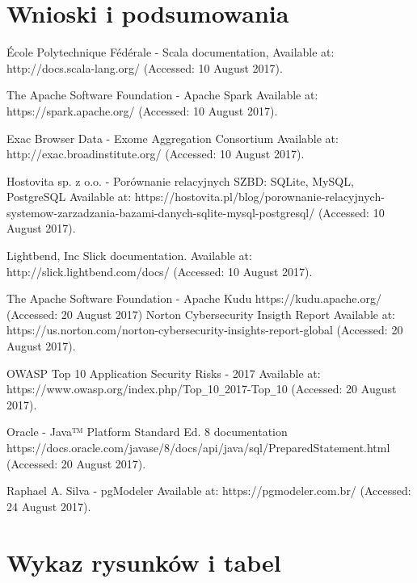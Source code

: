 \documentclass[a4paper,12pt,twoside]{article}
\begin{document}
\section{Wnioski i podsumowania}  

\newpage
\begin{thebibliography}{99}

École Polytechnique Fédérale - Scala documentation,
Available at: http://docs.scala-lang.org/ (Accessed: 10 August 2017).

The Apache Software Foundation - Apache Spark Available at: https://spark.apache.org/ (Accessed: 10 August 2017).

Exac Browser Data - Exome Aggregation Consortium  
Available at: http://exac.broadinstitute.org/ (Accessed: 10 August 2017).

Hostovita sp. z o.o. - Porównanie relacyjnych SZBD: SQLite, MySQL, PostgreSQL
Available at:
https://hostovita.pl/blog/porownanie-relacyjnych-systemow-zarzadzania-bazami-danych-sqlite-mysql-postgresql/ (Accessed: 10 August 2017).

Lightbend, Inc Slick documentation. Available at:
http://slick.lightbend.com/docs/ (Accessed: 10 August 2017).

The Apache Software Foundation - Apache Kudu
https://kudu.apache.org/ (Accessed: 20 August 2017)
Norton Cybersecurity Insigth Report 
Available at: https://us.norton.com/norton-cybersecurity-insights-report-global (Accessed: 20 August 2017).

OWASP Top 10 Application Security Risks - 2017 Available at: 
https://www.owasp.org/index.php/Top\verb!_!10\verb!_!2017-Top\verb!_!10 (Accessed: 20 August 2017).

Oracle - Java™ Platform Standard Ed. 8 documentation
https://docs.oracle.com/javase/8/docs/api/java/sql/PreparedStatement.html (Accessed: 20 August 2017).

Raphael A. Silva - pgModeler Available at: https://pgmodeler.com.br/
(Accessed: 24 August 2017).
\end{thebibliography}

\newpage
\section*{Wykaz rysunków i tabel} 
\end{document}
